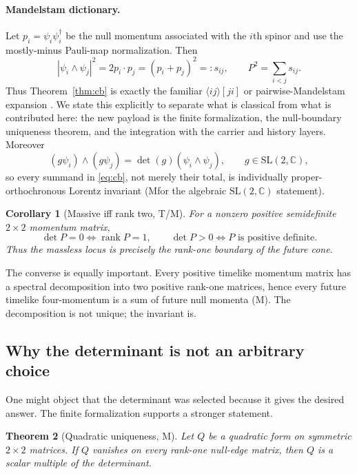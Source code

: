 \documentclass[11pt]{article}
\newcommand{\Mtag}{\textcolor{verified}{\textsc{M}}}
\newcommand{\Ttag}{\textcolor{external}{\textsc{T}}}
\newcommand{\rank}{\operatorname{rank}}
\newcommand{\C}{\mathbb{C}}
\newtheorem{theorem}{Theorem}[section]
\newtheorem{corollary}[theorem]{Corollary}
\begin{document}
\paragraph{Mandelstam dictionary.}
Let $p_i=\psi_i\psi_i^\dagger$ be the null momentum associated with the $i$th
spinor and use the mostly-minus Pauli-map normalization.  Then
\begin{equation}\label{eq:mandelstam}
 |\psi_i\wedge\psi_j|^2
   =2p_i\mathbin{\cdot}p_j
   =(p_i+p_j)^2=:s_{ij},
 \qquad
 P^2=\sum_{i<j}s_{ij}.
\end{equation}
Thus Theorem~\ref{thm:cb} is exactly the familiar
$\langle ij\rangle[ji]$ or pairwise-Mandelstam expansion
\cite{ElvangHuang,ArkaniHamedMassive}.  We state this explicitly to separate
what is classical from what is contributed here: the new payload is the finite
formalization, the null-boundary uniqueness theorem, and the integration with
the carrier and history layers.  Moreover
\begin{equation}\label{eq:termwiseSL2}
 (g\psi_i)\wedge(g\psi_j)=\det(g)(\psi_i\wedge\psi_j),
 \qquad g\in\mathrm{SL}(2,\C),
\end{equation}
so every summand in \eqref{eq:cb}, not merely their total, is individually
proper-orthochronous Lorentz invariant (\Mtag for the algebraic
$\mathrm{SL}(2,\C)$ statement).

\begin{corollary}[Massive iff rank two, \Ttag/\Mtag]
For a nonzero positive semidefinite $2\times2$ momentum matrix,
\[
  \det P=0\iff\rank P=1,
  \qquad
  \det P>0\iff P\text{ is positive definite}.
\]
Thus the massless locus is precisely the rank-one boundary of the future cone.
\end{corollary}

The converse is equally important.  Every positive timelike momentum matrix has
a spectral decomposition into two positive rank-one matrices, hence every
future timelike four-momentum is a sum of future null momenta (\Mtag).  The
decomposition is not unique; the invariant is.

\subsection{Why the determinant is not an arbitrary choice}

One might object that the determinant was selected because it gives the desired
answer.  The finite formalization supports a stronger statement.

\begin{theorem}[Quadratic uniqueness, \Mtag]\label{thm:detunique}
Let $Q$ be a quadratic form on symmetric $2\times2$ matrices.  If $Q$ vanishes
on every rank-one null-edge matrix, then $Q$ is a scalar multiple of the
determinant.
\end{theorem}
\end{document}
